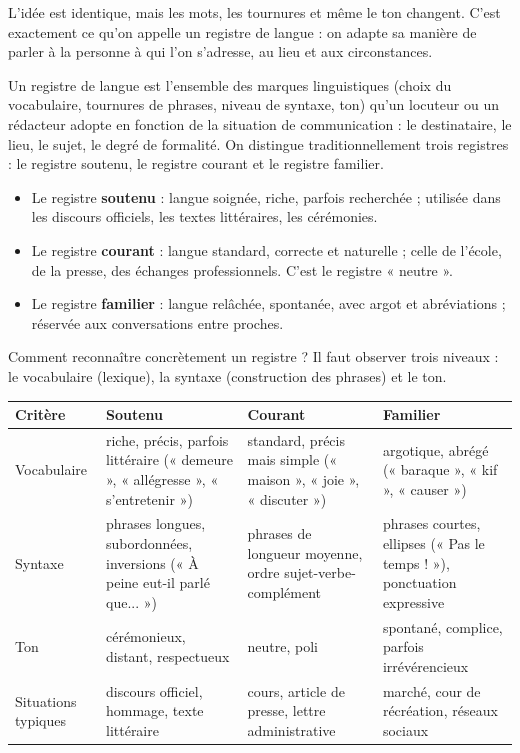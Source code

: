 \documentclass[11pt]{article}
\newcommand{\cle}[1]{{\popxbold\color{popdark}#1}}
\newcounter{popsec}
\newcounter{popsub}
\newcommand{\courssub}[1]{%
  \stepcounter{popsub}%
  \par\vspace{9pt}\noindent{\popxbold\fontsize{11.5}{13}\selectfont\color{popink}{\color{poporange}\thepopsec.\thepopsub}\hspace{6pt}#1}\par\nopagebreak\vspace{4pt}
}
\begin{document}
L'idée est identique, mais les mots, les tournures et même le ton changent. C'est exactement ce qu'on appelle un registre de langue : on adapte sa manière de parler à la personne à qui l'on s'adresse, au lieu et aux circonstances.

\begin{definition}
Un \cle{registre de langue} est l'ensemble des marques linguistiques (choix du vocabulaire, tournures de phrases, niveau de syntaxe, ton) qu'un locuteur ou un rédacteur adopte en fonction de la \cle{situation de communication} : le destinataire, le lieu, le sujet, le degré de formalité. On distingue traditionnellement trois registres : le registre \cle{soutenu}, le registre \cle{courant} et le registre \cle{familier}.
\end{definition}

\begin{aretenir}
\begin{itemize}
\item Le registre \textbf{soutenu} : langue soignée, riche, parfois recherchée ; utilisée dans les discours officiels, les textes littéraires, les cérémonies.
\item Le registre \textbf{courant} : langue standard, correcte et naturelle ; celle de l'école, de la presse, des échanges professionnels. C'est le registre « neutre ».
\item Le registre \textbf{familier} : langue relâchée, spontanée, avec argot et abréviations ; réservée aux conversations entre proches.
\end{itemize}
\end{aretenir}

\courssub{Les marqueurs des trois registres}

Comment reconnaître concrètement un registre ? Il faut observer trois niveaux : le \cle{vocabulaire} (lexique), la \cle{syntaxe} (construction des phrases) et le \cle{ton}.

\begin{center}
\begin{tabularx}{\linewidth}{|l|X|X|X|}
\hline
\rowcolor{popblueL} \textbf{Critère} & \textbf{Soutenu} & \textbf{Courant} & \textbf{Familier} \\
\hline
Vocabulaire & riche, précis, parfois littéraire (« demeure », « allégresse », « s'entretenir ») & standard, précis mais simple (« maison », « joie », « discuter ») & argotique, abrégé (« baraque », « kif », « causer ») \\
\hline
Syntaxe & phrases longues, subordonnées, inversions (« À peine eut-il parlé que... ») & phrases de longueur moyenne, ordre sujet-verbe-complément & phrases courtes, ellipses (« Pas le temps ! »), ponctuation expressive \\
\hline
Ton & cérémonieux, distant, respectueux & neutre, poli & spontané, complice, parfois irrévérencieux \\
\hline
Situations typiques & discours officiel, hommage, texte littéraire & cours, article de presse, lettre administrative & marché, cour de récréation, réseaux sociaux \\
\hline
\end{tabularx}
\end{center}
\end{document}
